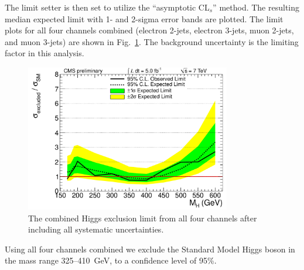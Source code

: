The limit setter is then set to utilize
the ``asymptotic CL$_{s}$''
\cite{cite:asympcls1,cite:asympcls2} method. 
The resulting median
expected limit with 1- and 2-sigma error bands are plotted.
The limit plots for all four channels combined (electron 2-jets, 
electron 3-jets, muon 2-jets, and muon 3-jets) are shown in
Fig.~\ref{fig:limitsetup:combinedlimit}. 
The background uncertainty is the limiting factor in this analysis.
\begin{figure}[htb] 
  \begin{center}
      \includegraphics[width=0.8\textwidth]{plots/2012_LIMITS/limit_4chan_fullsyst_asymp.pdf}
    \caption{The combined Higgs exclusion limit from all four channels 
      after including all systematic uncertainties.}
    \label{fig:limitsetup:combinedlimit}
  \end{center}
\end{figure}

Using all four channels combined we exclude the Standard Model 
Higgs boson in the mass range 325--410~GeV, to a confidence level
of 95\%. 
